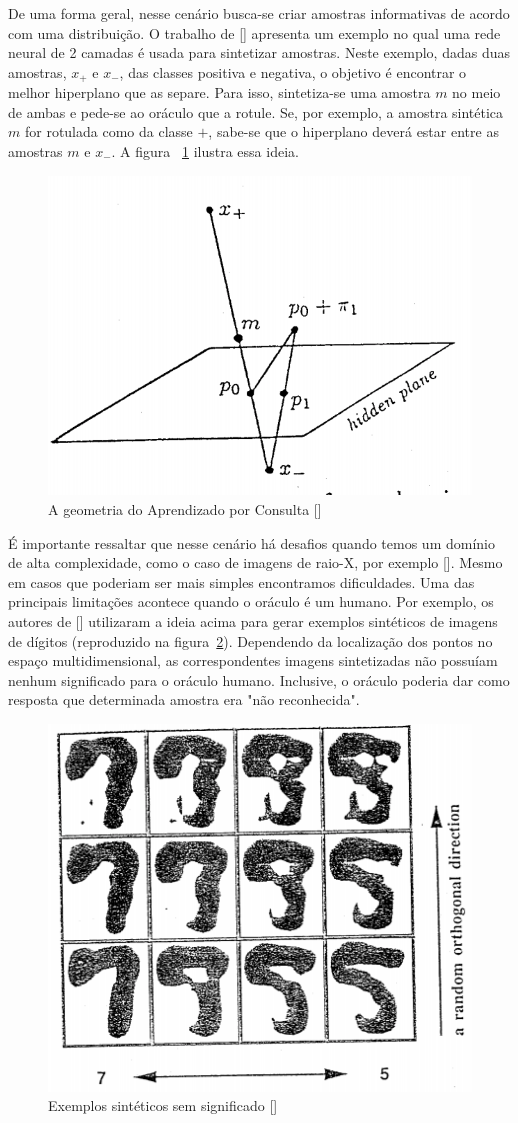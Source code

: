 De uma forma geral, nesse cenário busca-se criar amostras informativas de acordo com uma distribuição. O trabalho de [\cite{baum1992query}] apresenta um exemplo no qual uma rede neural de 2 camadas é usada para sintetizar amostras. Neste exemplo, dadas duas amostras, $x_+$ e $x_-$, das classes positiva e negativa, o objetivo é encontrar o melhor hiperplano que as separe. Para isso, sintetiza-se uma amostra $m$ no meio de ambas e pede-se ao oráculo que a rotule. Se, por exemplo, a amostra sintética $m$ for rotulada como da classe $+$, sabe-se que o hiperplano deverá estar entre as amostras $m$ e $x_-$. A figura ~\ref{fig:LangBaum_GeometryQueryLearning} ilustra essa ideia. 

\begin{figure}
  \centering
  \includegraphics[width=.4\textwidth]{figures/lang_baum_geometry_query_learning.png}
  \caption{A geometria do Aprendizado por Consulta [\cite{baum1992query}]}
  \label{fig:LangBaum_GeometryQueryLearning}
\end{figure}

É importante ressaltar que nesse cenário há desafios quando temos um domínio de alta complexidade, como o caso de imagens de raio-X, por exemplo [\cite{angluin1988queries}]. Mesmo em casos que poderiam ser mais simples encontramos dificuldades. Uma das principais limitações acontece quando o oráculo é um humano. Por exemplo, os autores de [\cite{baum1992query}] utilizaram a ideia acima para gerar exemplos sintéticos de imagens de dígitos (reproduzido na figura~\ref{fig:LangBaum_5vs9Example}). Dependendo da localização dos pontos no espaço multidimensional, as correspondentes imagens sintetizadas não possuíam nenhum significado para o oráculo humano. Inclusive, o oráculo poderia dar como resposta que determinada amostra era "não reconhecida".

\begin{figure}
  \centering
  \includegraphics[width=.4\textwidth]{figures/lang_baum_5_vs_9_example.png}
  \caption{Exemplos sintéticos sem significado [\cite{baum1992query}]}
  \label{fig:LangBaum_5vs9Example}
\end{figure}

